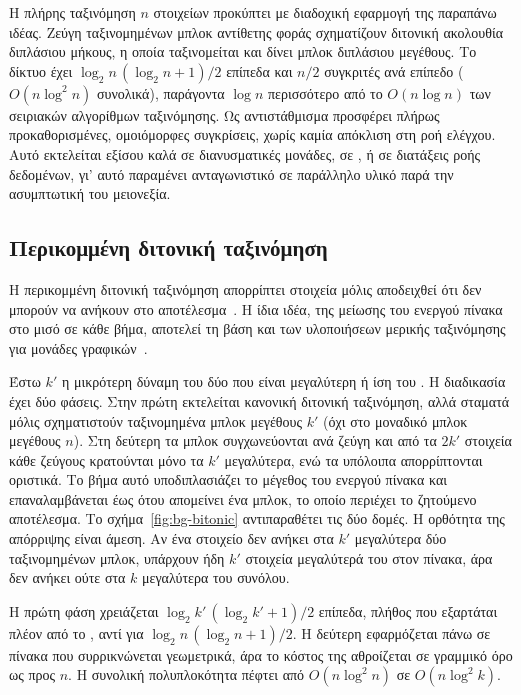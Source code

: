 Η πλήρης ταξινόμηση $n$ στοιχείων προκύπτει με διαδοχική εφαρμογή της παραπάνω
ιδέας. Ζεύγη ταξινομημένων μπλοκ αντίθετης φοράς σχηματίζουν διτονική ακολουθία
διπλάσιου μήκους, η οποία ταξινομείται και δίνει μπλοκ διπλάσιου μεγέθους. Το
δίκτυο έχει $\log_2 n \, (\log_2 n + 1)/2$ επίπεδα και $n/2$ συγκριτές ανά
επίπεδο ($O(n \log^2 n)$ συνολικά), παράγοντα $\log n$ περισσότερο από το $O(n
\log n)$ των σειριακών αλγορίθμων ταξινόμησης. Ως αντιστάθμισμα προσφέρει
πλήρως προκαθορισμένες, ομοιόμορφες συγκρίσεις, χωρίς καμία απόκλιση στη ροή
ελέγχου. Αυτό εκτελείται εξίσου καλά σε διανυσματικές μονάδες, σε , ή
σε διατάξεις ροής δεδομένων, γι' αυτό παραμένει ανταγωνιστικό σε παράλληλο
υλικό παρά την ασυμπτωτική του μειονεξία.

\subsection{Περικομμένη διτονική ταξινόμηση}
\label{sec:bg-truncated-bitonic}

Η περικομμένη διτονική ταξινόμηση απορρίπτει στοιχεία μόλις αποδειχθεί ότι δεν
μπορούν να ανήκουν στο αποτέλεσμα~\cite{sismanis2012}. Η ίδια ιδέα, της μείωσης
του ενεργού πίνακα στο μισό σε κάθε βήμα, αποτελεί τη βάση και των υλοποιήσεων
μερικής ταξινόμησης για μονάδες γραφικών~\cite{shanbhag2018}.

Έστω $k'$ η μικρότερη δύναμη του δύο που είναι μεγαλύτερη ή ίση του . Η
διαδικασία έχει δύο φάσεις. Στην πρώτη εκτελείται κανονική διτονική ταξινόμηση,
αλλά σταματά μόλις σχηματιστούν ταξινομημένα μπλοκ μεγέθους $k'$ (όχι στο
μοναδικό μπλοκ μεγέθους $n$). Στη δεύτερη τα μπλοκ συγχωνεύονται ανά ζεύγη και
από τα $2k'$ στοιχεία κάθε ζεύγους κρατούνται μόνο τα $k'$ μεγαλύτερα, ενώ τα
υπόλοιπα απορρίπτονται οριστικά. Το βήμα αυτό υποδιπλασιάζει το μέγεθος του
ενεργού πίνακα και επαναλαμβάνεται έως ότου απομείνει ένα μπλοκ, το οποίο
περιέχει το ζητούμενο αποτέλεσμα. Το σχήμα~\ref{fig:bg-bitonic} αντιπαραθέτει
τις δύο δομές. Η ορθότητα της απόρριψης είναι άμεση. Αν ένα στοιχείο δεν ανήκει
στα $k'$ μεγαλύτερα δύο ταξινομημένων μπλοκ, υπάρχουν ήδη $k'$ στοιχεία
μεγαλύτερά του στον πίνακα, άρα δεν ανήκει ούτε στα $k$ μεγαλύτερα του συνόλου.

Η πρώτη φάση χρειάζεται $\log_2 k' \, (\log_2 k' + 1)/2$ επίπεδα, πλήθος που
εξαρτάται πλέον από το , αντί για $\log_2 n \, (\log_2 n + 1)/2$. Η
δεύτερη εφαρμόζεται πάνω σε πίνακα που συρρικνώνεται γεωμετρικά, άρα το κόστος
της αθροίζεται σε γραμμικό όρο ως προς $n$. Η συνολική πολυπλοκότητα πέφτει από
$O(n \log^2 n)$ σε $O(n \log^2 k)$.

